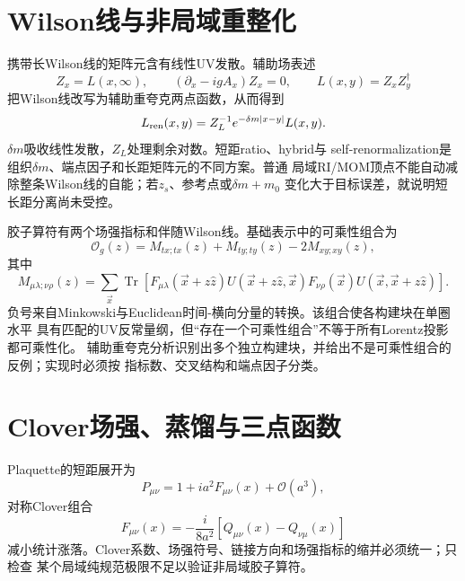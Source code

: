 \section{Wilson线与非局域重整化}

携带长Wilson线的矩阵元含有线性UV发散。辅助场表述
\begin{equation}
  Z_x=L(x,\infty),\qquad
  (\partial_x-igA_x)Z_x=0,
  \qquad L(x,y)=Z_xZ_y^\dagger
  \label{eq:b04-zfield}
\end{equation}
把Wilson线改写为辅助重夸克两点函数，从而得到
\begin{equation}
  L_{\rm ren}(x,y)=Z_L^{-1}e^{-\delta m|x-y|}L(x,y).
  \label{eq:b04-wilson-ren}
\end{equation}
$\delta m$吸收线性发散，$Z_L$处理剩余对数。短距ratio、hybrid与
self-renormalization是组织$\delta m$、端点因子和长距矩阵元的不同方案。普通
局域RI/MOM顶点不能自动减除整条Wilson线的自能；若$z_s$、参考点或$\delta m+m_0$
变化大于目标误差，就说明短长距分离尚未受控。

胶子算符有两个场强指标和伴随Wilson线。基础表示中的可乘性组合为
\begin{equation}
  \mathcal O_g(z)
  =M_{tx;tx}(z)+M_{ty;ty}(z)-2M_{xy;xy}(z),
  \label{eq:b04-gluon-combination}
\end{equation}
其中
\begin{equation}
  M_{\mu\lambda;\nu\rho}(z)
  =\sum_{\vec x}\operatorname{Tr}\!\left[
  F_{\mu\lambda}(\vec x+z\hat z)U(\vec x+z\hat z,\vec x)
  F_{\nu\rho}(\vec x)U(\vec x,\vec x+z\hat z)\right].
  \label{eq:b04-gluon-M}
\end{equation}
负号来自Minkowski与Euclidean时间-横向分量的转换。该组合使各构建块在单圈水平
具有匹配的UV反常量纲，但“存在一个可乘性组合”不等于所有Lorentz投影都可乘性化。
辅助重夸克分析识别出多个独立构建块，并给出不是可乘性组合的反例；实现时必须按
指标数、交叉结构和端点因子分类。

\section{Clover场强、蒸馏与三点函数}

Plaquette的短距展开为
\begin{equation}
  P_{\mu\nu}=1+ia^2F_{\mu\nu}(x)+\mathcal O(a^3),
  \label{eq:b04-plaquette}
\end{equation}
对称Clover组合
\begin{equation}
  F_{\mu\nu}(x)=-\frac{i}{8a^2}[Q_{\mu\nu}(x)-Q_{\nu\mu}(x)]
  \label{eq:b04-clover}
\end{equation}
减小统计涨落。Clover系数、场强符号、链接方向和场强指标的缩并必须统一；只检查
某个局域纯规范极限不足以验证非局域胶子算符。

